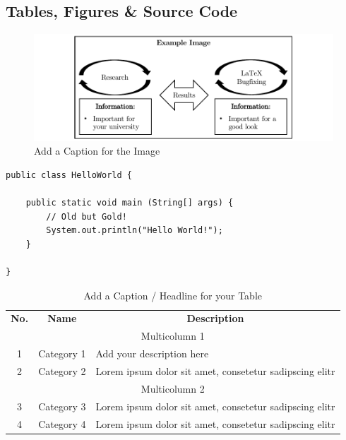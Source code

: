 \documentclass[
	12pt,
	a4paper,
	american,
	oneside
	]{scrartcl}
\begin{document}
	
	\subsection{Tables, Figures \& Source Code}

	\begin{figure}[!htb]
		\centering
		\includegraphics[width=1\textwidth]{images/example-image}
		\caption{Add a Caption for the Image}
		\label{fig:figure1}
	\end{figure}

	\begin{minipage}{\linewidth}
		\linespread{1}
		\begin{lstlisting}[caption={Hello World in Java},captionpos=b,label=source:helloWorld]
public class HelloWorld {
	
	public static void main (String[] args)	{
		// Old but Gold!
		System.out.println("Hello World!");
	}

}
		\end{lstlisting}
	\end{minipage}

	\small
	\begin{longtable}{|c|c|p{}|}
		\hline
		\caption{Add a Caption / Headline for your Table}\label{tab:table2}\\
		\hline
		\multicolumn{1}{|c|}{\cellcolor{gray!40}\textbf{No.}} & \multicolumn{1}{c|}{\cellcolor{gray!40}\textbf{Name}} & \multicolumn{1}{c|}{\cellcolor{gray!40}\textbf{Description}} \\ \hline
		\multicolumn{3}{|c|}{\cellcolor{gray!40}Multicolumn 1}\\  \hline
		1  & Category 1 & Add your description here \\ \hline
		2 & Category 2 & Lorem ipsum dolor sit amet, consetetur sadipscing elitr \\  \hline
		\multicolumn{3}{|c|}{\cellcolor{gray!40}Multicolumn 2} \\  \hline
		3 & Category 3 & Lorem ipsum dolor sit amet, consetetur sadipscing elitr \\  \hline
		4 & Category 4 & Lorem ipsum dolor sit amet, consetetur sadipscing elitr \\  \hline
	\end{longtable}
\end{document}
